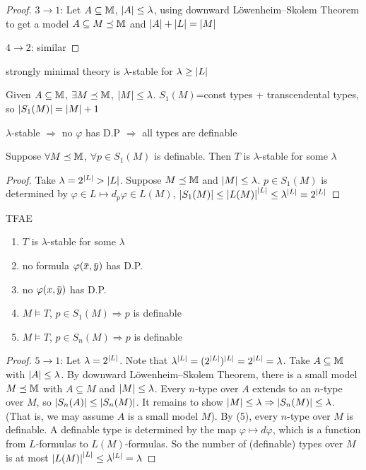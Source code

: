\documentclass[11pt]{article}
\begin{document}
\begin{proof}
\(3\to 1\): Let \(A\subseteq\mathbb{M}\), \(\abs{A}\le\lambda\), using downward Löwenheim–Skolem Theorem to get a model
\(A\subseteq M\preceq\mathbb{M}\) and \(\abs{A}+\abs{L}=\abs{M}\)

\(4\to 2\): similar
\end{proof}


\begin{examplle}[]
strongly minimal theory is \(\lambda\)-stable for \(\lambda\ge\abs{L}\)

Given \(A\subseteq\mathbb{M}\), \(\exists M\preceq\mathbb{M}\), \(\abs{M}\le\lambda\). \(S_1(M)\)=const types + transcendental types, so \(\abs{S_1(M)}=\abs{M}+1\)
\end{examplle}

\(\lambda\)-stable \(\Rightarrow\) no \(\varphi\) has D.P \(\Rightarrow\) all types are definable

\begin{lemma}[]
Suppose \(\forall M\preceq\mathbb{M}\), \(\forall p\in S_1(M)\) is definable. Then \(T\) is \(\lambda\)-stable for some \(\lambda\)
\end{lemma}

\begin{proof}
Take \(\lambda=2^{\abs{L}}>\abs{L}\). Suppose \(M\preceq\mathbb{M}\)  and \(\abs{M}\le\lambda\). \(p\in S_1(M)\) is determined
by \(\varphi\in L\mapsto  d_p\varphi\in L(M)\), \(\abs{S_1(M)}\le\abs{L(M)}^{\abs{L}}\le\lambda^{\abs{L}}=2^{\abs{L}}\)
\end{proof}

\begin{theorem}[]
TFAE
\begin{enumerate}
\item \(T\) is \(\lambda\)-stable for some \(\lambda\)
\item no formula \(\varphi(\barx,\bary)\) has D.P.
\item no \(\varphi(x,\bary)\) has D.P.
\item \(M\vDash T\), \(p\in S_1(M)\Rightarrow p\) is definable
\item \(M\vDash T\), \(p\in S_n(M)\Rightarrow p\) is definable
\end{enumerate}
\end{theorem}

\begin{proof}
\(5\to 1\): Let \(\lambda=2^{\abs{L}}\). Note
that \(\lambda^{\abs{L}}=(2^{\abs{L}})^{\abs{L}}=2^{\abs{L}}=\lambda\). Take \(A\subseteq\mathbb{M}\) with \(\abs{A}\le\lambda\). By
downward Löwenheim–Skolem Theorem, there is a small model \(M\preceq\mathbb{M}\) with \(A\subseteq M\)
and \(\abs{M}\le\lambda\). Every \(n\)-type over \(A\) extends to an \(n\)-type over \(M\),
so \(\abs{S_n(A)}\le\abs{S_n(M)}\). It remains to show \(\abs{M}\le\lambda\Rightarrow\abs{S_n(M)}\le\lambda\). (That is, we
may assume \(A\) is a small model \(M\)). By (5), every \(n\)-type over \(M\) is definable. A
definable type is determined by the map \(\varphi\mapsto d\varphi\), which is a function from \(L\)-formulas
to \(L(M)\)-formulas. So the number of (definable) types over \(M\) is at
most \(\abs{L(M)}^{\abs{L}}\le\lambda^{\abs{L}}=\lambda\)
\end{proof}
\end{document}
